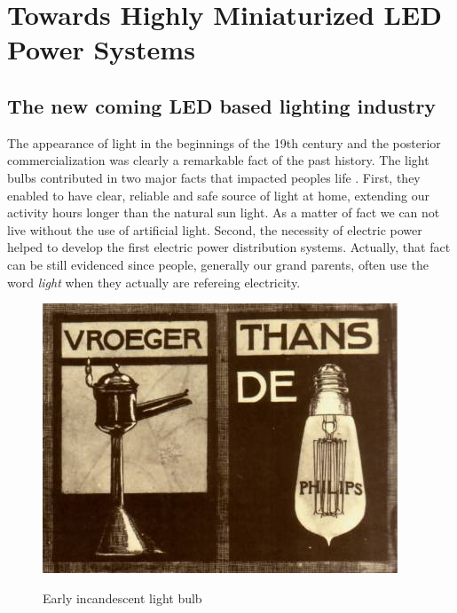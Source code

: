 \part{Towards Highly Miniaturized LED Power Systems }
\label{ch:twrd_HMLED}

\chapter{The new coming LED based lighting industry}

The appearance of light in the beginnings of the 19th century and the posterior commercialization was clearly a remarkable fact of the past history. The light bulbs contributed in two major facts that impacted peoples life . First, they enabled to have clear, reliable and safe source of light at home, extending our activity hours longer than the natural sun light. As a matter of fact we can not live without the use of artificial light.   Second, the necessity of electric power helped to develop the first electric power distribution systems. Actually, that fact can be still evidenced since people, generally our grand parents, often use the word \emph{light} when they actually are refereing electricity.

\begin{figure}[!h]
\centering
\includegraphics{./0_intro/img/1900-philips3.jpg}
\label{fig:incandescent_light_blub}
\caption{Early incandescent light bulb}
\end{figure}



